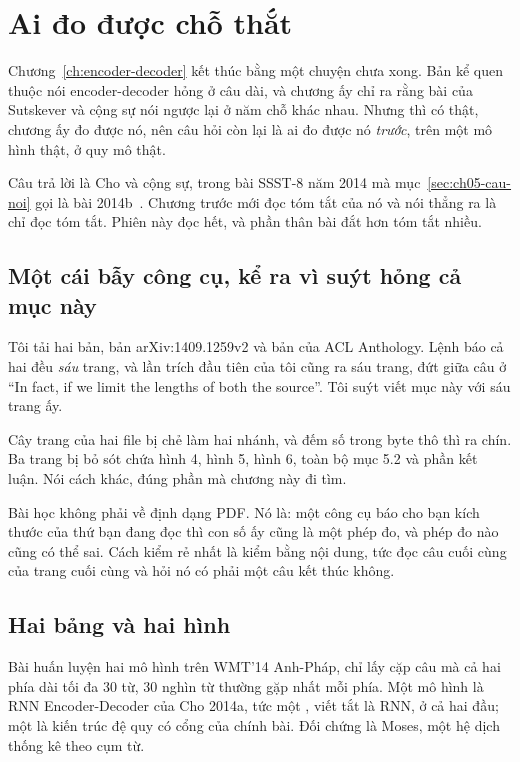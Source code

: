 \section{Ai đo được chỗ thắt}
\label{sec:ch06-ai-do}

%
Chương~\ref{ch:encoder-decoder} kết thúc bằng một chuyện chưa xong. Bản kể quen
thuộc nói encoder-decoder hỏng ở câu dài, và chương ấy chỉ ra rằng bài của
Sutskever và cộng sự nói ngược lại ở năm chỗ khác nhau. Nhưng  thì có thật, chương ấy đo được nó, nên câu hỏi còn lại là ai
đo được nó \emph{trước}, trên một mô hình thật, ở quy mô thật.

Câu trả lời là Cho và cộng sự, trong bài SSST-8 năm 2014 mà
mục~\ref{sec:ch05-cau-noi} gọi là bài 2014b~\autocite{cho2014properties}. Chương
trước mới đọc tóm tắt của nó và nói thẳng ra là chỉ đọc tóm tắt. Phiên này đọc
hết, và phần thân bài đắt hơn tóm tắt nhiều.

\subsection*{Một cái bẫy công cụ, kể ra vì suýt hỏng cả mục này}

%
Tôi tải hai bản, bản arXiv:1409.1259v2 và bản của ACL Anthology. Lệnh
 báo cả hai đều \emph{sáu} trang, và lần trích đầu tiên của tôi cũng
ra sáu trang, đứt giữa câu ở \enquote{In fact, if we limit the lengths of both
the source}. Tôi suýt viết mục này với sáu trang ấy.

Cây trang của hai file bị chẻ làm hai nhánh, và đếm số  trong
byte thô thì ra chín. Ba trang bị bỏ sót chứa hình 4, hình 5, hình 6, toàn bộ
mục 5.2 và phần kết luận. Nói cách khác, đúng phần mà chương này đi tìm.

Bài học không phải về định dạng PDF. Nó là: một công cụ báo cho bạn kích thước
của thứ bạn đang đọc thì con số ấy cũng là một phép đo, và phép đo nào cũng có
thể sai. Cách kiểm rẻ nhất là kiểm bằng nội dung, tức đọc câu cuối cùng của
trang cuối cùng và hỏi nó có phải một câu kết thúc không.

\subsection*{Hai bảng và hai hình}

%
Bài huấn luyện hai mô hình trên WMT'14 Anh-Pháp, chỉ lấy cặp câu mà cả hai phía
dài tối đa 30 từ,  30 nghìn từ thường gặp nhất mỗi phía.
Một mô hình là RNN Encoder-Decoder của Cho 2014a, tức một
, viết tắt là RNN, ở cả hai đầu; một
là kiến trúc  đệ quy có cổng của chính bài. Đối chứng là Moses, một hệ
dịch thống kê theo cụm từ.

